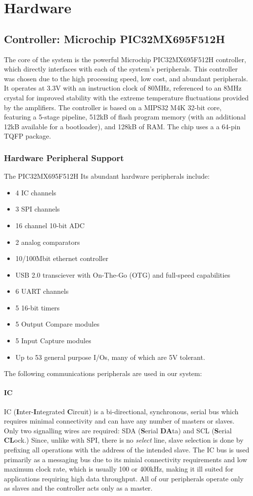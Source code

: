 \chapter{Hardware}

\section{Controller: Microchip PIC32MX695F512H}
The core of the system is the powerful Microchip PIC32MX695F512H controller, which directly interfaces with each of the system's peripherals. This controller was chosen due to the high processing speed, low cost, and abundant peripherals. It operates at 3.3V with an instruction clock of 80MHz, referenced to an 8MHz crystal for improved stability with the extreme temperature fluctuations provided by the amplifiers. The controller is based on a MIPS32 M4K 32-bit core, featuring a 5-stage pipeline, 512kB of flash program memory (with an additional 12kB available for a bootloader), and 128kB of RAM. The chip uses a a 64-pin TQFP package.
\subsection{Hardware Peripheral Support}
The PIC32MX695F512H Its abundant hardware peripherals include:
\begin{itemize}
\item 4 IC channels
\item 3 SPI channels
\item 16 channel 10-bit ADC
\item 2 analog comparators
\item 10/100Mbit ethernet controller
\item USB 2.0 transciever with On-The-Go (OTG) and full-speed capabilities
\item 6 UART channels
\item 5 16-bit timers
\item 5 Output Compare modules
\item 5 Input Capture modules
\item Up to 53 general purpose I/Os, many of which are 5V tolerant. 
\end{itemize}

The following communications peripherals are used in our system:
\subsubsection*{IC}
IC (\textbf{I}nter-\textbf{I}ntegrated \textbf{C}ircuit) is a bi-directional, synchronous, serial bus which requires minimal connectivity and can have any number of masters or slaves. Only two signalling wires are required: SDA (\textbf{S}erial \textbf{DA}ta) and SCL (\textbf{S}erial \textbf{CL}ock.) Since, unlike with SPI, there is no \textit{select} line, slave selection is done by prefixing all operations with the address of the intended slave. The IC bus is used primarily as a messaging bus due to its minial connectivity requirements and low maximum clock rate, which is usually 100 or 400kHz, making it ill suited for applications requiring high data throughput. All of our peripherals operate only as slaves and the controller acts only as a master.
